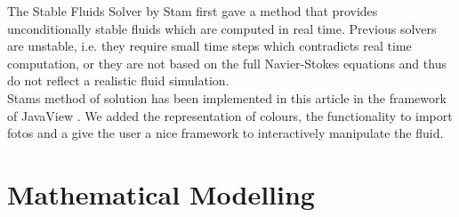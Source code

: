 \documentclass[a4paper,10pt,oneside,final,german,openbib,pdftex,titlepage]{scrbook}
\begin{document}
The Stable Fluids Solver by Stam \cite{Stam} first gave a method that provides unconditionally stable fluids which are computed in real time. Previous solvers are unstable, i.e. they require small time steps which contradicts real time computation, or they are not based on the full Navier-Stokes equations and thus do not reflect a realistic fluid simulation.\\

Stams method of solution has been implemented in this article in the framework of JavaView \cite{JavaView}. We added the representation of colours, the functionality to import fotos and a give the user a nice framework to interactively manipulate the fluid.
 
\chapter{Mathematical Modelling} \label{Section:Mathematical Modelling} \label{chapter:Math}
\end{document}
